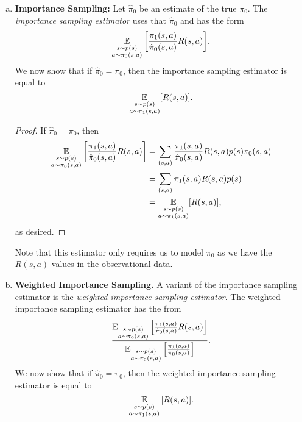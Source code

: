 \documentclass[12pt,letterpaper,boxed]{hmcpset}
\begin{document}
\begin{solution}
  \begin{enumerate}[(a)]
    \item \textbf{Importance Sampling:} Let $\hat \pi_0$ be an estimate of the true $\pi_0$. The \emph{importance sampling estimator} uses that $\hat \pi_0$ and has the form 
    \[
    \operatorname*{\mathbb{E}}_{\substack{s \sim p(s) \\ a \sim \pi_0 (s,a)}} \qty[\frac{\pi_1(s,a)}{\hat \pi_0 (s,a)} R(s,a)].
    \]
    We now show that if $\hat \pi_0 = \pi_0$, then the importance sampling estimator is equal to 
    \[
    \operatorname*{\mathbb{E}}_{\substack{s \sim p(s) \\ a \sim \pi_1(s,a)}} [R(s,a)].
    \]
    
    \begin{proof}
      If $\hat \pi_0 = \pi_0$, then
      \[
      \begin{aligned}
        \operatorname*{\mathbb{E}}_{\substack{s \sim p(s) \\ a \sim \pi_0 (s,a)}} \qty[\frac{\pi_1(s,a)}{\hat \pi_0 (s,a)} R(s,a)] &= 
        \sum_{(s,a)} \frac{\pi_1(s,a)}{\hat \pi_0 (s,a)} R(s,a) p(s) \pi_0 (s,a) \\
        &= \sum_{(s,a)} \pi_1(s,a) R(s,a) p(s) \\
        &= \operatorname*{\mathbb{E}}_{\substack{s \sim p(s) \\ a \sim \pi_1(s,a)}} [R(s,a)],
      \end{aligned}
      \]
      as desired.
    \end{proof}
    Note that this estimator only requires us to model $\pi_0$ as we have the $R(s,a)$ values in the observational data.

    \item \textbf{Weighted Importance Sampling.} A variant of the importance sampling estimator is the \emph{weighted importance sampling estimator}. The weighted importance sampling estimator has the from
    \[
    \frac{\operatorname*{\mathbb{E}}_{\substack{s \sim p(s) \\ a \sim \pi_0 (s,a)}}\qty[\frac{\pi_1(s,a)}{\hat \pi_0 (s,a)} R(s,a)] }{ \operatorname*{\mathbb{E}}_{\substack{s \sim p(s) \\ a \sim \pi_0 (s,a)}}\qty[\frac{\pi_1(s,a)}{\hat \pi_0 (s,a)}] }.
    \]
    We now show that if $\hat \pi_0 = \pi_0$, then the weighted importance sampling estimator is equal to 
    \[
    \operatorname*{\mathbb{E}}_{\substack{s \sim p(s) \\ a \sim \pi_1(s,a)}} \qty[R(s,a)].
    \]


\end{enumerate}
\end{solution}
\end{document}

